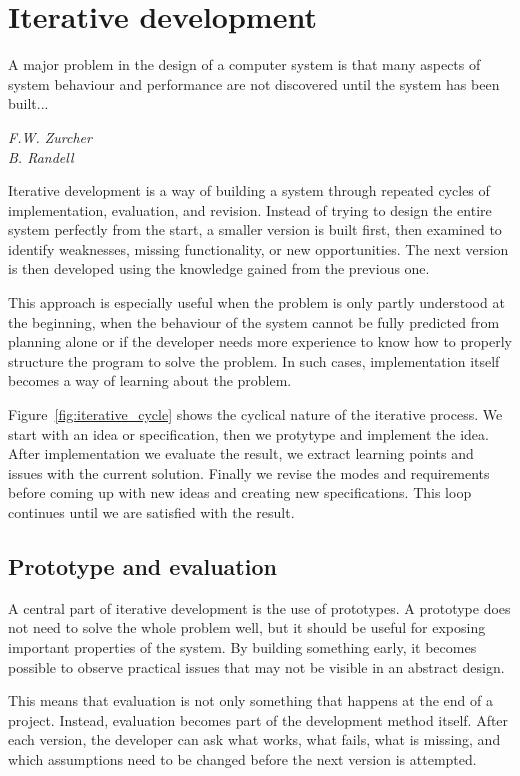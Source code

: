 \section{Iterative development}

  \epigraph{
A major problem in the design of a computer system is that many aspects of system behaviour and performance are not discovered until the system has been built...\cite{zurcherIterativeMultiLevelModeling1968}}{\textit{F.W. Zurcher \\ B. Randell}}

  Iterative development is a way of building a system through repeated cycles of implementation, evaluation, and revision. Instead of trying to design the entire system perfectly from the start, a smaller version is built first, then examined to identify weaknesses, missing functionality, or new opportunities. The next version is then developed using the knowledge gained from the previous one.

  This approach is especially useful when the problem is only partly understood at the beginning, when the behaviour of the system cannot be fully predicted from planning alone or if the developer needs more experience to know how to properly structure the program to solve the problem. In such cases, implementation itself becomes a way of learning about the problem.

  Figure~\ref{fig:iterative_cycle} shows the cyclical nature of the iterative process. We start with an idea or specification, then we protytype and implement the idea. After implementation we evaluate the result, we extract learning points and issues with the current solution. Finally we revise the modes and requirements before coming up with new ideas and creating new specifications. This loop continues until we are satisfied with the result.
  

\subsection{Prototype and evaluation}

  A central part of iterative development is the use of prototypes. A prototype does not need to solve the whole problem well, but it should be useful for exposing important properties of the system. By building something early, it becomes possible to observe practical issues that may not be visible in an abstract design.

  This means that evaluation is not only something that happens at the end of a project. Instead, evaluation becomes part of the development method itself. After each version, the developer can ask what works, what fails, what is missing, and which assumptions need to be changed before the next version is attempted.

